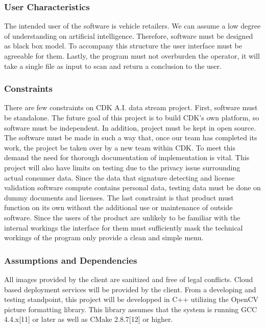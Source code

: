 \documentclass[article, onecolumn, draftclsnofoot,10pt, compsoc]{IEEEtran}
\begin{document}
\subsubsection{User Characteristics}
The intended user of the software is vehicle retailers. We can assume a low degree of understanding on artificial intelligence. Therefore, software must be designed as black box model. To accompany this structure the user interface must be agreeable for them. Lastly, the program must not overburden the operator, it will take a single file as input to scan and return a conclusion to the user.


\subsubsection{Constraints}
There are few constraints on CDK A.I. data stream project. First, software must be standalone. The future goal of this project is to build CDK’s own platform, so software must be independent. In addition, project must be kept in open source. The software must be made in such a way that, once our team has completed its work, the project be taken over by a new team within CDK. To meet this demand the need for thorough documentation of implementation is vital. This project will also have limits on testing due to the privacy issue surrounding actual consumer data. Since the data that signature detecting and license validation software compute contains personal data, testing data must be done on dummy documents and licenses. The last constraint is that product must function on its own without the additional use or maintenance of outside software. Since the users of the product are unlikely to be familiar with the internal workings the interface for them must sufficiently mask the technical workings of the program only provide a clean and simple menu.

\subsubsection{Assumptions and Dependencies}

All images provided by the client are sanitized and free of legal conflicts. Cloud based deployment services will be provided by the client. From a developing and testing standpoint, this project will be developped in C++ utilizing the OpenCV picture formatting library. This library assumes that the system is running GCC 4.4.x[11] or later as well as CMake 2.8.7[12] or higher. 
\end{document}
